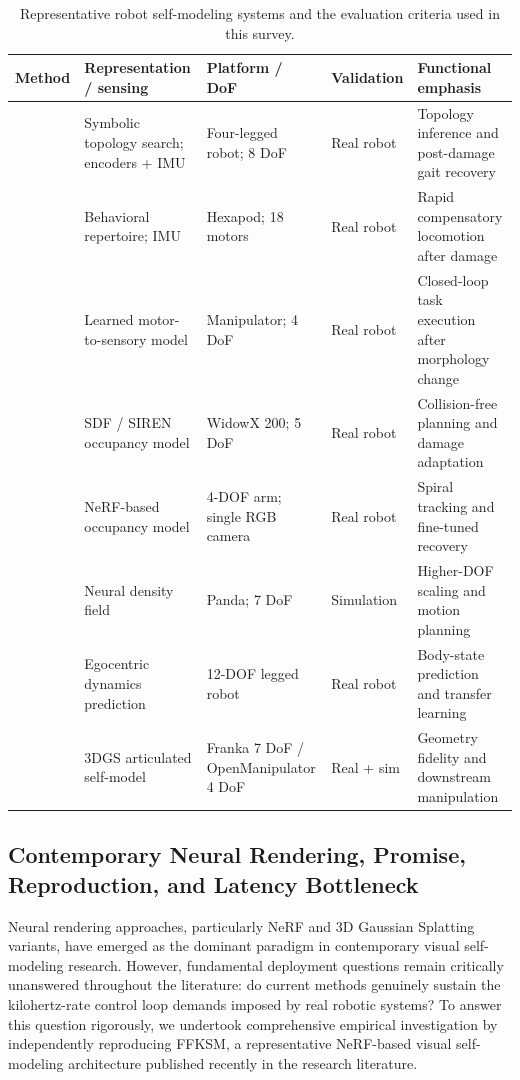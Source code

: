 ﻿\documentclass[11pt,a4paper]{article}
\begin{document}
\begin{table}[htbp]
\centering
\caption{Representative robot self-modeling systems and the evaluation criteria used in this survey.}
\label{tab:selfmodel_comparison}
\renewcommand{\arraystretch}{1.2}
\small
\begin{tabularx}{\textwidth}{@{}p{2.8cm}p{3.2cm}p{2.4cm}p{2.2cm}X@{}}
\toprule
Method & Representation / sensing & Platform / DoF & Validation & Functional emphasis \\
\midrule
\cite{bongard2006resilient} & Symbolic topology search; encoders + IMU & Four-legged robot; 8 DoF & Real robot & Topology inference and post-damage gait recovery \\
\cite{cully2015robots} & Behavioral repertoire; IMU & Hexapod; 18 motors & Real robot & Rapid compensatory locomotion after damage \\
\cite{kwiatkowski2019task} & Learned motor-to-sensory model & Manipulator; 4 DoF & Real robot & Closed-loop task execution after morphology change \\
\cite{chen2022full} & SDF / SIREN occupancy model & WidowX 200; 5 DoF & Real robot & Collision-free planning and damage adaptation \\
\cite{hu2024teaching} & NeRF-based occupancy model & 4-DOF arm; single RGB camera & Real robot & Spiral tracking and fine-tuned recovery \\
\cite{schulze2024high} & Neural density field & Panda; 7 DoF & Simulation & Higher-DOF scaling and motion planning \\
\cite{hu2024egocentric} & Egocentric dynamics prediction & 12-DOF legged robot & Real robot & Body-state prediction and transfer learning \\
\cite{hu2025learning} & 3DGS articulated self-model & Franka 7 DoF / OpenManipulator 4 DoF & Real + sim & Geometry fidelity and downstream manipulation \\
\bottomrule
\end{tabularx}
\end{table}

\subsection{Contemporary Neural Rendering, Promise, Reproduction, and Latency Bottleneck}

Neural rendering approaches, particularly NeRF and 3D Gaussian Splatting variants, have emerged as the dominant paradigm in contemporary visual self-modeling research. However, fundamental deployment questions remain critically unanswered throughout the literature: do current methods genuinely sustain the kilohertz-rate control loop demands imposed by real robotic systems? To answer this question rigorously, we undertook comprehensive empirical investigation by independently reproducing FFKSM, a representative NeRF-based visual self-modeling architecture published recently in the research literature.
\end{document}
